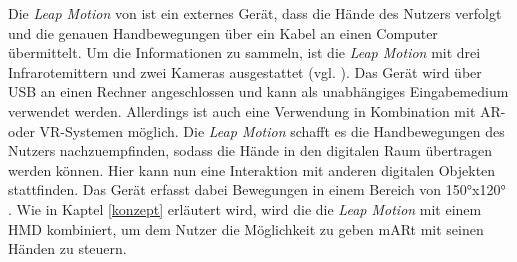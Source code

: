 Die \textit{Leap Motion} von \cite{leapMotion} ist ein externes Gerät, dass die Hände des Nutzers verfolgt und die genauen Handbewegungen über ein Kabel an einen Computer übermittelt. 
Um die Informationen zu sammeln, ist die \textit{Leap Motion} mit drei Infrarotemittern und zwei Kameras ausgestattet (vgl. \cite{Weichert13}). Das Gerät wird über USB an einen Rechner angeschlossen und kann als unabhängiges Eingabemedium verwendet werden. Allerdings ist auch eine Verwendung in Kombination mit AR- oder VR-Systemen möglich. 
Die \textit{Leap Motion} schafft es die Handbewegungen des Nutzers nachzuempfinden, sodass die Hände in den digitalen Raum übertragen werden können. Hier kann nun eine Interaktion mit anderen digitalen Objekten stattfinden. Das Gerät erfasst dabei Bewegungen in einem Bereich von 150°x120° \cite{leapFOV}.
Wie in Kaptel \ref{konzept} erläutert wird, wird die die \textit{Leap Motion} mit einem HMD kombiniert, um dem Nutzer die Möglichkeit zu geben mARt mit seinen Händen zu steuern.








